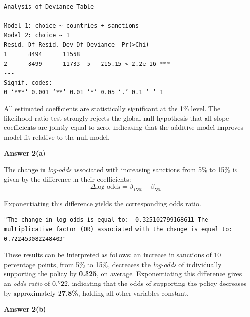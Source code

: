 \documentclass[12pt,letterpaper]{article}
\begin{document}
\begin{verbatim}
Analysis of Deviance Table

Model 1: choice ~ countries + sanctions
Model 2: choice ~ 1
Resid. Df Resid. Dev Df Deviance  Pr(>Chi)    
1      8494      11568                          
2      8499      11783 -5  -215.15 < 2.2e-16 ***
---
Signif. codes:  
0 ‘***’ 0.001 ‘**’ 0.01 ‘*’ 0.05 ‘.’ 0.1 ‘ ’ 1
\end{verbatim}

\noindent All estimated coefficients are statistically significant at the 1\% level. The likelihood ratio test strongly rejects the global null hypothesis that all slope coefficients are jointly equal to zero, indicating that the additive model improves model fit relative to the null model.

\vspace{1cm}

\textbf{Answer 2(a)}\\
\vspace{0.5cm}

\noindent The change in \emph{log-odds} associated with increasing sanctions from 5\% to 15\% is given by the difference in their coefficients:
\[
\Delta \text{log-odds} = \beta_{\text{15\%}} - \beta_{\text{5\%}}
\]

\noindent Exponentiating this difference yields the corresponding odds ratio.

\vspace{0.5cm}


\begin{verbatim}
"The change in log-odds is equal to: -0.325102799168611 The
multiplicative factor (OR) associated with the change is equal to:
0.722453082248403"
\end{verbatim}

\noindent These results can be interpreted as follows: an increase in sanctions of 10 percentage points, from 5\% to 15\%, decreases the \emph{log-odds} of individually supporting the policy by \textbf{0.325}, on average. Exponentiating this difference gives an \emph{odds ratio} of 0.722, indicating that the odds of supporting the policy decreases by approximately \textbf{27.8\%}, holding all other variables constant.

\vspace{1cm}

\textbf{Answer 2(b)}\\
\vspace{0.5cm}
\end{document}
